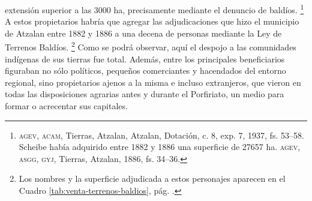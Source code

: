 \documentclass[14pt,twoside,final]{extbook} %
\let\oldfootnote\footnote
\renewcommand\footnote[1]{%
\oldfootnote{\hspace{1mm}#1}}
\begin{document}
extensión superior a las 3000 ha, precisamente mediante el denuncio de baldíos.\footnote{\textsc{agev, acam}, Tierras, Atzalan, Atzalan, Dotación, c. 8, exp. 7, 1937, fs. 53--58. Scheibe\index[nombres]{Scheibe, Gustavo} había adquirido entre 1882 y 1886 una superficie de 27657 ha. \textsc{agev, asgg, gyj}, Tierras, Atzalan, 1886, fs. 34--36.} A estos propietarios habría que agregar las adjudicaciones que hizo el municipio de Atzalan entre 1882 y 1886 a una decena de personas mediante la Ley de Terrenos Baldíos.\footnote{Los nombres y la superficie adjudicada a estos personajes aparecen en el Cuadro  \ref{tab:venta-terrenos-baldios}, pág. \pageref{tab:venta-terrenos-baldios}.} Como se podrá observar, aquí el despojo a las comunidades indígenas de sus tierras fue total. Además, entre los principales beneficiarios figuraban no sólo políticos, pequeños comerciantes y hacendados del entorno regional, sino propietarios ajenos a la misma e incluso extranjeros, que vieron en todas las disposiciones agrarias antes y durante el Porfiriato, un medio para formar o acrecentar sus capitales.
\end{document}
